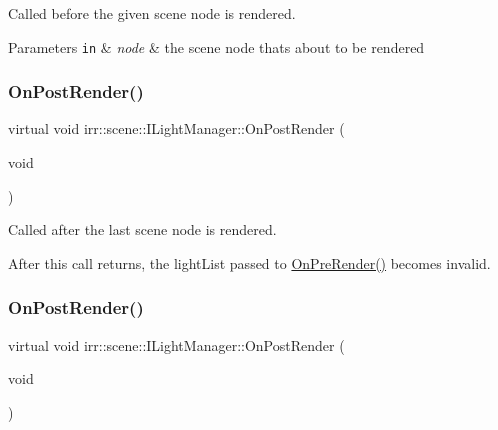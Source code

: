 Called before the given scene node is rendered. 


\begin{DoxyParams}[1]{Parameters}
\mbox{\tt in}  & {\em node} & the scene node that\textquotesingle{}s about to be rendered \\
\hline
\end{DoxyParams}
\mbox{\label{classirr_1_1scene_1_1ILightManager_ac8f92f0fbd43ba9cb01b47647125a1a3}} 
\subsubsection{\texorpdfstring{On\+Post\+Render()}{OnPostRender()}\hspace{0.1cm}{\footnotesize\ttfamily [1/2]}}
{\footnotesize\ttfamily virtual void irr\+::scene\+::\+I\+Light\+Manager\+::\+On\+Post\+Render (\begin{DoxyParamCaption}\item[{void}]{ }\end{DoxyParamCaption})\hspace{0.3cm}{\ttfamily [pure virtual]}}



Called after the last scene node is rendered. 

After this call returns, the light\+List passed to \hyperlink{classirr_1_1scene_1_1ILightManager_a07d93dbbdba50c7a26d1c293949e3781}{On\+Pre\+Render()} becomes invalid. \mbox{\label{classirr_1_1scene_1_1ILightManager_ac8f92f0fbd43ba9cb01b47647125a1a3}} 
\subsubsection{\texorpdfstring{On\+Post\+Render()}{OnPostRender()}\hspace{0.1cm}{\footnotesize\ttfamily [2/2]}}
{\footnotesize\ttfamily virtual void irr\+::scene\+::\+I\+Light\+Manager\+::\+On\+Post\+Render (\begin{DoxyParamCaption}\item[{void}]{ }\end{DoxyParamCaption})\hspace{0.3cm}{\ttfamily [pure virtual]}}



